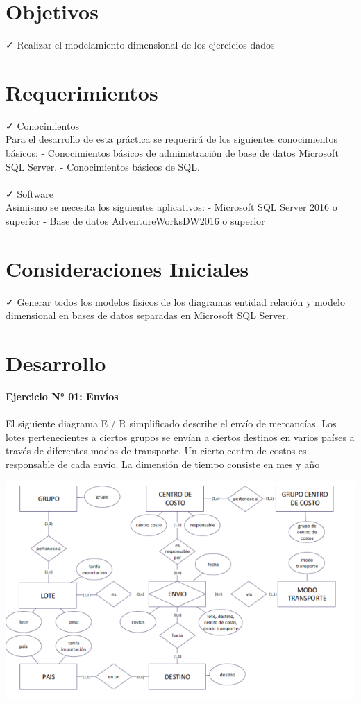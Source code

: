 

\section{Objetivos}
✓ Realizar el modelamiento dimensional de los ejercicios dados

\section{Requerimientos}
\item{✓ Conocimientos\\
Para el desarrollo de esta práctica se requerirá de los siguientes conocimientos básicos:
- Conocimientos básicos de administración de base de datos Microsoft SQL Server.
- Conocimientos básicos de SQL.\\\\
✓ Software\\
Asimismo se necesita los siguientes aplicativos:
- Microsoft SQL Server 2016 o superior
- Base de datos AdventureWorksDW2016 o superior}

\section{Consideraciones Iniciales}
\item{
✓ Generar todos los modelos fisicos de los diagramas entidad relación y modelo dimensional en bases de datos separadas en Microsoft SQL Server.}

\section{Desarrollo}
\item{
\textbf{Ejercicio N° 01: Envíos}\\\\
El siguiente diagrama E / R simplificado describe el envío de mercancías. Los lotes pertenecientes a ciertos grupos se
envían a ciertos destinos en varios países a través de diferentes modos de transporte. Un cierto centro de costos es
responsable de cada envío. La dimensión de tiempo consiste en mes y año}

\begin{center}
\includegraphics[width=15cm]{./Imagenes/diagrama1}
\end{center}

